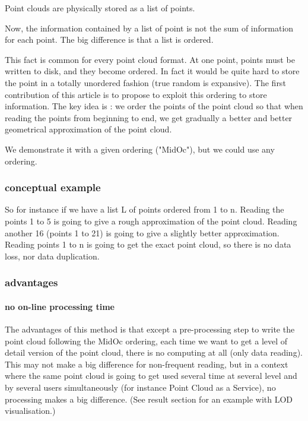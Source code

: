 			Point clouds are physically stored as a list of points. 
			
			Now, the information contained by a list of point is not the sum of information for each point. The big difference is that a list is ordered.
			
			This fact is common for every point cloud format. At one point, points must be written to disk, and they become ordered. In fact it would be quite hard to store the point in a totally unordered fashion (true random is expansive).
			The first contribution of this article is to propose to exploit this ordering to store information.
			The key idea is : we order the points of the point cloud so that when reading the points from beginning to end, we get gradually a better and better geometrical approximation of the point cloud. 
			
			We demonstrate it with a given ordering ("MidOc"), but we could use any ordering.
			
		\subsubsection{conceptual example}
			So for instance if we have a list L of points ordered from 1 to n.
			Reading the points 1 to 5 is going to give a rough approximation of the point cloud. Reading another 16 (points 1 to 21) is going to give a slightly better approximation. Reading points 1 to n is going to get the exact point cloud, so there is no data loss, nor data duplication.
		
		\subsubsection{advantages}
			\paragraph{no on-line processing time}
				The advantages of this method is that except a pre-processing step to write the point cloud following the MidOc ordering, each time we want to get a level of detail version of the point cloud, there is no computing at all (only data reading).
				This may not make a big difference for non-frequent reading, but in a context where the same point cloud is going to get used several time at several level and by several users simultaneously (for instance Point Cloud as a Service), no processing makes a big difference.
				(See result section for an example with LOD visualisation.) 		
